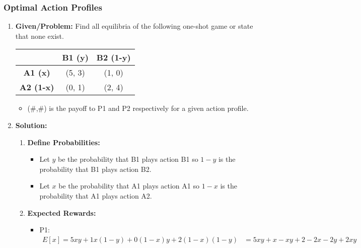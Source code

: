 \subsubsection{Optimal Action Profiles}
\newpage
\begin{example}
    \begin{enumerate}
        \item \textbf{Given/Problem:} Find all equilibria of the following one-shot game or state that none exist.
        \vspace{1em}
            \begin{center}
            \begin{tabular}{ccc}
            \toprule
            & \textbf{B1 (y)} & \textbf{B2 (1-y)} \\
            \midrule
            \textbf{A1 (x)} & (5, 3) & (1, 0) \\
            \textbf{A2 (1-x)} & (0, 1) & (2, 4) \\
            \bottomrule
            \end{tabular}
            \end{center}
        \vspace{1em}
        \begin{itemize}
            \item (\#,\#) is the payoff to P1 and P2 respectively for a given action profile.
        \end{itemize}
        \item \textbf{Solution:}
        \begin{enumerate}
            \item \textbf{Define Probabilities:}
            \begin{itemize}
                \item Let $y$ be the probability that B1 plays action B1 so $1-y$ is the probability that B1 plays action B2.
                \item Let $x$ be the probability that A1 plays action A1 so $1-x$ is the probability that A1 plays action A2.
            \end{itemize}
            \item \textbf{Expected Rewards:} 
            \begin{itemize}
                \item P1: 
                \begin{align*}
                    E[x] = 5xy + 1x(1-y) + 0(1-x)y + 2(1-x)(1-y) &= 5xy + x - xy + 2 - 2x - 2y + 2xy \\

\end{align*}
\end{itemize}
\end{enumerate}
\end{enumerate}
\end{example}
